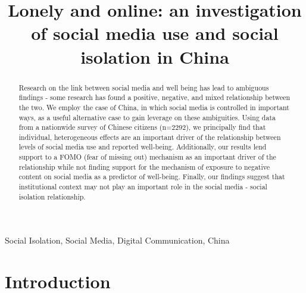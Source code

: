 \documentclass[]{interact}
\theoremstyle{plain}%
\theoremstyle{definition}
\theoremstyle{remark}
\begin{document}
\title{Lonely and online: an investigation of social media use and
social isolation in China}



\author{
}

\maketitle

\begin{abstract}
Research on the link between social media and well being has lead to
ambiguous findings - some research has found a positive, negative, and
mixed relationship between the two. We employ the case of China, in
which social media is controlled in important ways, as a useful
alternative case to gain leverage on these ambiguities. Using data from
a nationwide survey of Chinese citizens (n=2292), we principally find
that individual, heterogeneous effects are an important driver of the
relationship between levels of social media use and reported well-being.
Additionally, our results lend support to a FOMO (fear of missing out)
mechanism as an important driver of the relationship while not finding
support for the mechanism of exposure to negative content on social
media as a predictor of well-being. Finally, our findings suggest that
institutional context may not play an important role in the social media
- social isolation relationship.
\end{abstract}

\begin{keywords}
    Social Isolation, Social Media, Digital Communication, 
    China
\end{keywords}\ifdefined\Shaded\renewenvironment{Shaded}{\begin{tcolorbox}[sharp corners, boxrule=0pt, interior hidden, borderline west={3pt}{0pt}{shadecolor}, frame hidden, breakable, enhanced]}{\end{tcolorbox}}\fi

\newpage{}

\hypertarget{introduction}{%
\section{Introduction}\label{introduction}}
\end{document}
